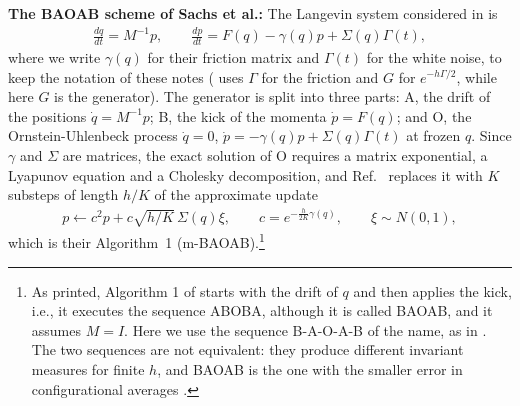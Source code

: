 \documentclass[11pt]{article}
\begin{document}
{\bf The BAOAB scheme of Sachs et al.:} The Langevin system considered in \cite{sachs} is
\begin{align}
  \frac{dq}{dt}=M^{-1}p,\qquad\frac{dp}{dt}=F(q)-\gamma(q)p+\Sigma(q)\Gamma(t),
  \label{sachslangevin}
\end{align}
where we write $\gamma(q)$ for their friction matrix and $\Gamma(t)$ for the white noise, to keep the notation of these notes (\cite{sachs} uses $\Gamma$ for the friction and $G$ for $e^{-h\Gamma/2}$, while here $G$ is the generator). The generator is split into three parts: A, the drift of the positions $\dot{q}=M^{-1}p$; B, the kick of the momenta $\dot{p}=F(q)$; and O, the Ornstein-Uhlenbeck process $\dot{q}=0$, $\dot{p}=-\gamma(q)p+\Sigma(q)\Gamma(t)$ at frozen $q$. Since $\gamma$ and $\Sigma$ are matrices, the exact solution of O requires a matrix exponential, a Lyapunov equation and a Cholesky decomposition, and Ref.~\cite{sachs} replaces it with $K$ substeps of length $h/K$ of the approximate update
\begin{align}
  p\leftarrow c^2p+c\sqrt{h/K}\,\Sigma(q)\xi,\qquad c=e^{-\frac{h}{2K}\gamma(q)},\qquad\xi\sim N(0,1),
  \label{dfd}
\end{align}
which is their Algorithm~1 (m-BAOAB).\footnote{As printed, Algorithm 1 of \cite{sachs} starts with the drift of $q$ and then applies the kick, i.e., it executes the sequence ABOBA, although it is called BAOAB, and it assumes $M=I$. Here we use the sequence B-A-O-A-B of the name, as in \cite{leimkuhler}. The two sequences are not equivalent: they produce different invariant measures for finite $h$, and BAOAB is the one with the smaller error in configurational averages \cite{leimkuhler}.}
\end{document}

